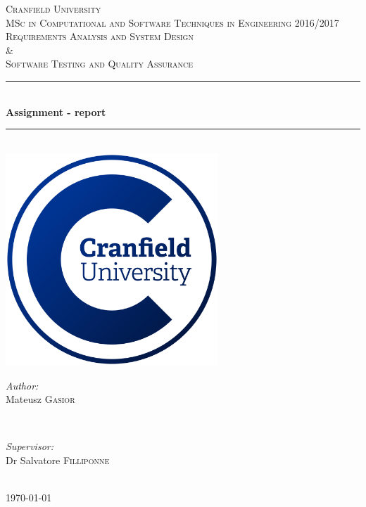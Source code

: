 \begin{titlepage}
		\newcommand{\HRule}{\rule{\linewidth}{0.5mm}}
		
		\center
		
		\textsc{\LARGE Cranfield University}\\[1.5cm]
		\textsc{\Large MSc in Computational and Software Techniques in Engineering 2016/2017}\\[0.5cm]
		\textsc{\large Requirements Analysis and System Design \\ \& \\Software Testing and Quality Assurance}\\[0.5cm]
		
		\HRule \\[0.4cm]
		{ \huge \bfseries Assignment - report}\\[0.4cm]
		\HRule \\[1.5cm]
		
		\includegraphics[width=8cm]{img/cranfield-logo}\\[1cm]
		
		\vfill
		\begin{minipage}{0.4\textwidth}
			\begin{flushleft} \large
				\emph{Author:}\\
				Mateusz \textsc{Gasior}
			\end{flushleft}
		\end{minipage}
		~
		\begin{minipage}{0.4\textwidth}
			\begin{flushright} \large
				\emph{Supervisor:} \\
				Dr Salvatore \textsc{Filliponne}
			\end{flushright}
		\end{minipage}\\[2cm]
		
		\vfill
		{\large \today}
		\clearpage
	\end{titlepage}
